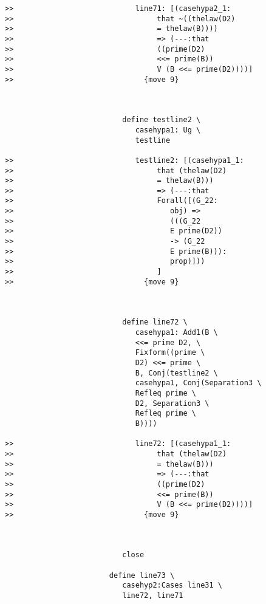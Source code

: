 \documentclass[12pt]{article}
\begin{document}
\begin{verbatim}
>>                            line71: [(casehypa2_1:
>>                                 that ~((thelaw(D2)
>>                                 = thelaw(B))))
>>                                 => (---:that
>>                                 ((prime(D2)
>>                                 <<= prime(B))
>>                                 V (B <<= prime(D2))))]
>>                              {move 9}



                           define testline2 \
                              casehypa1: Ug \
                              testline

>>                            testline2: [(casehypa1_1:
>>                                 that (thelaw(D2)
>>                                 = thelaw(B)))
>>                                 => (---:that
>>                                 Forall([(G_22:
>>                                    obj) =>
>>                                    (((G_22
>>                                    E prime(D2))
>>                                    -> (G_22
>>                                    E prime(B))):
>>                                    prop)]))
>>                                 ]
>>                              {move 9}



                           define line72 \
                              casehypa1: Add1(B \
                              <<= prime D2, \
                              Fixform((prime \
                              D2) <<= prime \
                              B, Conj(testline2 \
                              casehypa1, Conj(Separation3 \
                              Refleq prime \
                              D2, Separation3 \
                              Refleq prime \
                              B))))

>>                            line72: [(casehypa1_1:
>>                                 that (thelaw(D2)
>>                                 = thelaw(B)))
>>                                 => (---:that
>>                                 ((prime(D2)
>>                                 <<= prime(B))
>>                                 V (B <<= prime(D2))))]
>>                              {move 9}



                           close

                        define line73 \
                           casehyp2:Cases line31 \
                           line72, line71


\end{verbatim}
\end{document}
